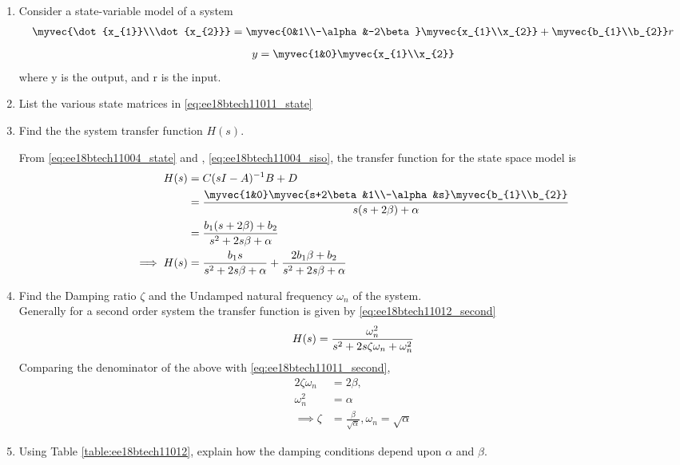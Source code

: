 \begin{enumerate}[label=\thesubsection.\arabic*.,ref=\thesubsection.\theenumi]

\item Consider a state-variable model of a system 
\begin{align}
\label{eq:ee18btech11011_state}
\myvec{\dot{x_{1}}\\\dot{x_{2}}}
=
\myvec{0&1\\-\alpha&-2\beta}\myvec{x_{1}\\x_{2}}
+
\myvec{b_{1}\\b_{2}}  r
\end{align}
\begin{align}
y
=
\myvec{1&0}\myvec{x_{1}\\x_{2}}
\end{align}
where y is the output, and r is the input.
%
\item List the various state matrices in \eqref{eq:ee18btech11011_state}

\item Find the the system transfer function $H(s)$.

\solution From \eqref{eq:ee18btech11004_state} and ,
%
\eqref{eq:ee18btech11004_siso}, 
the transfer function for the state space model is
\begin{align}
H(s) &= C(sI - A)^{-1}B + D
\\
& = \frac
{
\myvec{1&0}\myvec{s+2\beta&1\\-\alpha&s}\myvec{b_{1}\\b_{2}}
}
{
s(s+2\beta) + \alpha
}
\\
&= {\frac{b_{1}(s+2\beta) + b_{2}}{s^{2}+2s\beta+\alpha}}
\\
   \implies H(s) &= {\frac{b_{1}s}{s^{2}+2s\beta+\alpha}} + \LARGE{\frac{2b_{1}\beta + b_{2}}{s^{2}+2s\beta+\alpha}}
\label{eq:ee18btech11011_second}
\end{align}
%
\item Find the Damping ratio $\zeta$ and the Undamped natural frequency $\omega_{n}$ of the system.
\\
\solution Generally for a second order system the transfer function is given by \ref{eq:ee18btech11012_second}
%
\begin{align}
H(s) = \LARGE{\frac{\omega_{n}^2}{s^{2}+2s\zeta\omega_{n}+\omega_{n}^2}}
\end{align}
%
Comparing the denominator of the above with \eqref{eq:ee18btech11011_second},
%
\begin{align}
2\zeta\omega_{n} &= 2\beta,
\\
\omega_{n}^2 &= \alpha
\\
\implies \zeta &= \frac{\beta}{\sqrt{\alpha}} , \omega_{n} = \sqrt{\alpha}
\end{align}
%
\item Using Table \ref{table:ee18btech11012}, explain how the damping conditions depend upon $\alpha$ and  $\beta$.


\end{enumerate}
